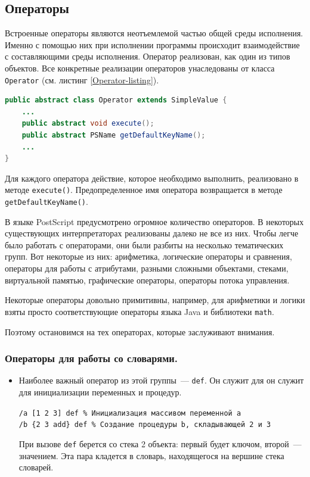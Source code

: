 \subsection{Операторы}
Встроенные операторы являются неотъемлемой частью общей среды исполнения. Именно с помощью них при исполнении программы происходит взаимодействие с составляющими среды исполнения. Оператор реализован, как один из типов объектов. Все конкретные реализации операторов унаследованы от класса \texttt{Operator} (см. листинг \ref{Operator-listing}).

\begin{lstlisting}[label=Operator-listing,caption=Абстракный класс Operator, frame = none, language = Java]
public abstract class Operator extends SimpleValue {
    ...
    public abstract void execute();
    public abstract PSName getDefaultKeyName();
    ...
} 
\end{lstlisting}
Для каждого оператора действие, которое необходимо выполнить, реализовано в методе \texttt{execute()}. Предопределенное имя оператора возвращается в методе \texttt{getDefaultKeyName()}.

В языке PostScript предусмотрено огромное количество операторов. В некоторых существующих интерпретаторах реализованы далеко не все из них. Чтобы легче было работать с операторами, они были разбиты на несколько тематических групп. Вот некоторые из них: арифметика, логические операторы и сравнения, операторы для работы с атрибутами, разными сложными объектами, стеками, виртуальной памятью, графические операторы, операторы потока управления.

Некоторые операторы довольно примитивны, например, для арифметики и логики взяты просто соответствующие операторы языка Java и библиотеки \texttt{math}. 

\iffalse Поэтому остановимся на тех операторах, которые заслуживают внимания.
\subsubsection*{Операторы для работы со словарями.}
\begin{itemize}
\item Наиболее важный оператор из этой группы~--- \texttt{def}. Он служит для он служит для инициализации переменных и процедур.

\texttt{/a [1 2 3] def \% Инициализация массивом переменной a \\
/b \{2 3 add\} def \% Создание процедуры b, складывающей 2 и 3
}

При вызове \texttt{def} берется со стека 2 объекта: первый будет ключом, второй~--- значением. Эта пара кладется в словарь, находящегося на вершине стека словарей.
\end{itemize}

